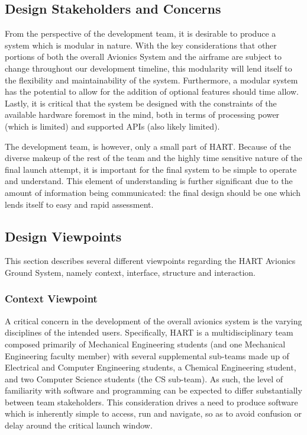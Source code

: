 \documentclass[journal,10pt,onecolumn,compsoc]{IEEEtran}
\begin{document}
	\subsection{Design Stakeholders and Concerns}
		\noindent From the perspective of the development team, it is desirable to produce a system which is modular in nature.
		With the key considerations that other portions of both the overall Avionics System and the airframe are subject to change throughout our development timeline, this modularity will lend itself to the flexibility and maintainability of the system.
		Furthermore, a modular system has the potential to allow for the addition of optional features should time allow.
		Lastly, it is critical that the system be designed with the constraints of the available hardware foremost in the mind, both in terms of processing power (which is limited) and supported APIs (also likely limited).
		
		\noindent The development team, is however, only a small part of HART.
		Because of the diverse makeup of the rest of the team and the highly time sensitive nature of the final launch attempt, it is important for the final system to be simple to operate and understand.
		This element of understanding is further significant due to the amount of information being communicated: the final design should be one which lends itself to easy and rapid assessment.

	\subsection{Design Viewpoints}
		\noindent This section describes several different viewpoints regarding the HART Avionics Ground System, namely context, interface, structure and interaction.

		\subsubsection{Context Viewpoint}
			\noindent A critical concern in the development of the overall avionics system is the varying disciplines of the intended users. 
			Specifically, HART is a multidisciplinary team composed primarily of Mechanical Engineering students (and one Mechanical Engineering faculty member) with several supplemental sub-teams made up of Electrical and Computer Engineering students, a Chemical Engineering student, and two Computer Science students (the CS sub-team).
			As such, the level of familiarity with software and programming can be expected to differ substantially between team stakeholders.
			This consideration drives a need to produce software which is inherently simple to access, run and navigate, so as to avoid confusion or delay around the critical launch window. 
\end{document}

